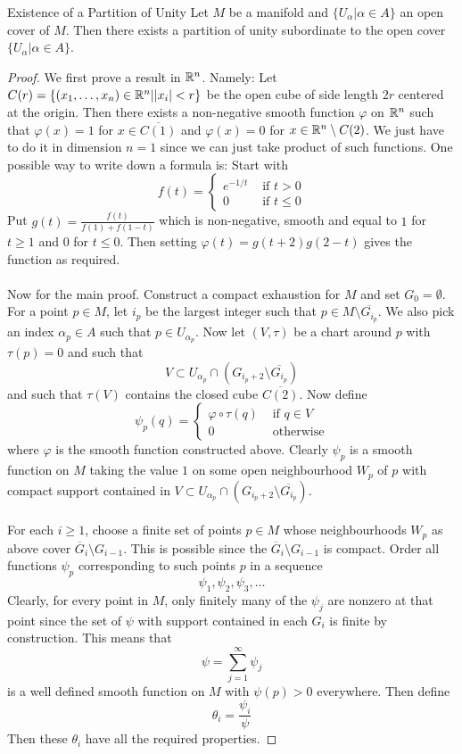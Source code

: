 \documentclass[a4paper]{article}
\begin{document}
\begin{thm}{Existence of a Partition of Unity}{} Let $M$ be a manifold and $\{U_\alpha|\alpha\in A\}$ an open cover of $M$. Then there exists a partition of unity subordinate to the open cover $\{U_\alpha|\alpha\in A\}$. \tcbline
\begin{proof}
We first prove a result in $\mathbb{R}^n$. Namely: Let $C(r)=\{(x_1,\dots,x_n)\in\mathbb{R}^n|\abs{x_i}<r\}$ be the open cube of side length $2r$ centered at the origin. Then there exists a non-negative smooth function $\varphi$ on $\mathbb{R}^n$ such that $\varphi(x)=1$ for $x\in\overline{C(1)}$ and $\varphi(x)=0$ for $x\in\mathbb{R}^n\setminus C(2)$. We just have to do it in dimension $n=1$ since we can just take product of such functions. One possible way to write down a formula is: Start with $$f(t)=\begin{cases}
e^{-1/t} & \text{ if }t>0\\
0 & \text{ if }t\leq 0
\end{cases}$$
Put $g(t)=\frac{f(t)}{f(1)+f(1-t)}$ which is non-negative, smooth and equal to $1$ for $t\geq 1$ and $0$ for $t\leq 0$. Then setting $\varphi(t)=g(t+2)g(2-t)$ gives the function as required. \\~\\
Now for the main proof. Construct a compact exhaustion for $M$ and set $G_0=\emptyset$. For a point $p\in M$, let $i_p$ be the largest integer such that $p\in M\setminus\overline{G_{i_p}}$. We also pick an index $\alpha_p\in A$ such that $p\in U_{\alpha_p}$. Now let $(V,\tau)$ be a chart around $p$ with $\tau(p)=0$ and such that $$V\subset U_{\alpha_p}\cap(G_{i_p+2}\setminus\overline{G_{i_p}})$$ and such that $\tau(V)$ contains the closed cube $\overline{C(2)}$. Now define $$\psi_p(q)=\begin{cases}
\varphi\circ\tau(q) & \text{ if }q\in V\\
0 &\text{ otherwise}
\end{cases}$$ where $\varphi$ is the smooth function constructed above. Clearly $\psi_p$ is a smooth function on $M$ taking the value $1$ on some open neighbourhood $W_p$ of $p$ with compact support contained in $V\subset U_{\alpha_p}\cap(G_{i_p+2}\setminus\overline{G_{i_p}})$. \\~\\
For each $i\geq 1$, choose a finite set of points $p\in M$ whose neighbourhoods $W_p$ as above cover $\overline{G}_i\setminus G_{i-1}$. This is possible since the $\overline{G}_i\setminus G_{i-1}$ is compact. Order all functions $\psi_p$ corresponding to such points $p$ in a sequence $$\psi_1,\psi_2,\psi_3,\dots$$ Clearly, for every point in $M$, only finitely many of the $\psi_j$ are nonzero at that point since the set of $\psi$ with support contained in each $G_i$ is finite by construction. This means that $$\psi=\sum_{j=1}^\infty\psi_j$$ is a well defined smooth function on $M$ with $\psi(p)>0$ everywhere. Then define $$\theta_i=\frac{\psi_i}{\psi}$$ Then these $\theta_i$ have all the required properties. 
\end{proof}
\end{thm}
\end{document}
